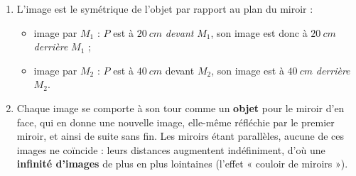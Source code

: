 \documentclass[11pt,a4paper]{article}
\begin{document}
\begin{corrige}
\begin{enumerate}[label=\alph*)]
  \item L'image est le symétrique de l'objet par rapport au plan du miroir :
        \begin{itemize}[leftmargin=1.5em,topsep=1pt]
          \item image par $M_1$ : $P$ est à $\qty{20}{cm}$ \emph{devant} $M_1$, son image est donc à
                $\qty{20}{cm}$ \emph{derrière} $M_1$ ;
          \item image par $M_2$ : $P$ est à $\qty{40}{cm}$ devant $M_2$, son image est à
                $\qty{40}{cm}$ \emph{derrière} $M_2$.
        \end{itemize}
  \item Chaque image se comporte à son tour comme un \textbf{objet} pour le miroir d'en face, qui en
        donne une nouvelle image, elle-même réfléchie par le premier miroir, et ainsi de suite sans
        fin. Les miroirs étant parallèles, aucune de ces images ne coïncide : leurs distances
        augmentent indéfiniment, d'où une \textbf{infinité d'images} de plus en plus lointaines (l'effet
        « couloir de miroirs »).
\end{enumerate}
\end{corrige}
\end{document}
